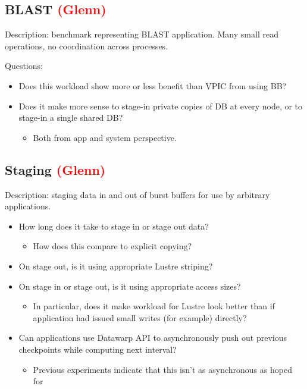 \documentclass[conference,10pt,compsocconf]{IEEEtran}
\newcommand{\assign}[1]{\textcolor{red}{(#1)}}
\begin{document}
\subsection{BLAST \assign{Glenn}}

Description: benchmark representing BLAST application.  Many small read
operations, no coordination across processes.

Questions:
\begin{itemize}
\item Does this workload show more or less benefit than VPIC from using BB?
\item Does it make more sense to stage-in private copies of DB at every
node, or to stage-in a single shared DB?
    \begin{itemize}
    \item Both from app and system perspective.
    \end{itemize}
\end{itemize}

\subsection{Staging \assign{Glenn}}

Description: staging data in and out of burst buffers for use by arbitrary
applications.

\begin{itemize}
\item How long does it take to stage in or stage out data?
    \begin{itemize}
    \item How does this compare to explicit copying?
    \end{itemize}
\item On stage out, is it using appropriate Lustre striping?
\item On stage in or stage out, is it using appropriate access sizes?
    \begin{itemize}
    \item In particular, does it make workload for Lustre look better than if
    application had issued small writes (for example) directly?
    \end{itemize}
\item Can applications use Datawarp API to asynchronously push out previous
checkpoints while computing next interval?
    \begin{itemize}
    \item Previous experiments indicate that this isn't as asynchronous as
    hoped for
    \end{itemize}
\end{itemize}
\end{document}
